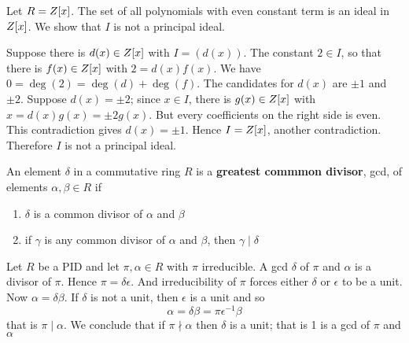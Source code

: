 \documentclass[11pt]{article}
\begin{document}
\begin{examplle}[]
Let \(R=\relax{Z}[x]\). The set of all polynomials with even constant term is an
ideal in \(\relax{Z}[x]\). We show that \(I\) is not a principal ideal.

Suppose there is \(d(x)\in\relax{Z}[x]\) with \(I=(d(x))\). The constant \(2\in I\),
so that there is \(f(x)\in\relax{Z}[x]\) with \(2=d(x)f(x)\). We have
\(0=\deg(2)=\deg(d)+\deg(f)\). The candidates for \(d(x)\) are \(\pm1\) and
\(\pm2\). Suppose \(d(x)=\pm2\); since \(x\in I\), there is \(g(x)\in\relax{Z}[x]\) with
\(x=d(x)g(x)=\pm2g(x)\). But every coefficients on the right side is even.
This contradiction gives \(d(x)=\pm1\). Hence \(I=\relax{Z}[x]\), another
contradiction. Therefore \(I\) is not a principal ideal.
\end{examplle}

\begin{definition}[]
An element \(\delta\) in a commutative ring \(R\) is a \textbf{greatest commmon divisor}, gcd, of
elements \(\alpha,\beta \in R\) if
\begin{enumerate}
\item \(\delta\) is a common divisor of \(\alpha\) and \(\beta\)
\item if \(\gamma\) is any common divisor of \(\alpha\) and \(\beta\), then \(\gamma\mid\delta\)
\end{enumerate}
\end{definition}

\begin{remark}
Let \(R\) be a PID and let \(\pi,\alpha\in R\) with \(\pi\) irreducible. A gcd \(\delta\) of
\(\pi\) and \(\alpha\) is a divisor of \(\pi\). Hence \(\pi=\delta\epsilon\). And
irreducibility of \(\pi\) forces either \(\delta\) or \(\epsilon\) to be a unit. Now
\(\alpha=\delta\beta\). If \(\delta\) is not a unit, then \(\epsilon\) is a unit and so 
\begin{equation*}
\alpha=\delta\beta=\pi\epsilon^{-1}\beta
\end{equation*}
that is \(\pi\mid\alpha\). We conclude that if \(\pi\nmid\alpha\) then \(\delta\) is a
unit; that is 1 is a gcd of \(\pi\) and \(\alpha\)
\end{remark}
\end{document}
